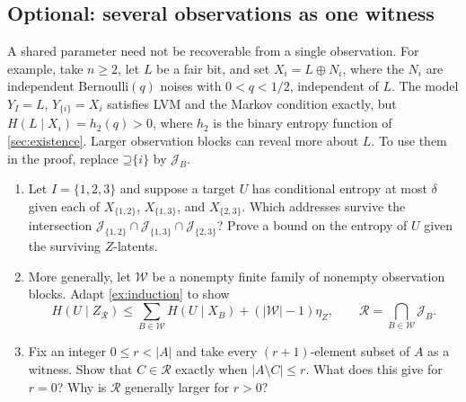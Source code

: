 \documentclass[11pt]{article}
\newcommand{\Up}{\mathord{\supseteq}}
\begin{document}
\subsection{Optional: several observations as one witness}
\label{sec:blocks}
A shared parameter need not be recoverable from a single observation. For
example, take $n\ge2$, let $L$ be a fair bit, and set
$X_i=L\mathbin{\oplus}N_i$, where the
$N_i$ are independent Bernoulli$(q)$ noises with $0<q<1/2$, independent of
$L$. The model $Y_I=L$, $Y_{\{i\}}=X_i$ satisfies LVM and the
Markov condition exactly, but $H(L\mid X_i)=h_2(q)>0$, where
$h_2$ is the binary entropy function of \cref{sec:existence}.
Larger observation blocks can reveal more about $L$. To use them in the proof,
replace $\Up\{i\}$ by $\mathcal{J}_B$.

\begin{exercise}
\label{ex:blocks}
\begin{enumerate}
\item Let $I=\{1,2,3\}$ and suppose a target $U$ has conditional entropy at
most $\delta$ given each of $X_{\{1,2\}}$, $X_{\{1,3\}}$, and
$X_{\{2,3\}}$. Which addresses survive the intersection
$\mathcal{J}_{\{1,2\}}\cap\mathcal{J}_{\{1,3\}}\cap\mathcal{J}_{\{2,3\}}$?
Prove a bound on the entropy of $U$ given the surviving $Z$-latents.
\item More generally, let $\mathcal{W}$ be a nonempty finite family of nonempty
observation blocks. Adapt \cref{ex:induction} to show
\[
 H(U\mid Z_{\mathcal{R}})\le
 \sum_{B\in\mathcal{W}}H(U\mid X_B)+(|\mathcal{W}|-1)\eta_Z,
 \qquad \mathcal{R}=\bigcap_{B\in\mathcal{W}}\mathcal{J}_B.
\]
\item Fix an integer $0\le r<|A|$ and take every $(r+1)$-element subset of $A$ as a
witness. Show that $C\in\mathcal{R}$ exactly when $|A\setminus C|\le r$.
What does this give for $r=0$? Why is $\mathcal{R}$ generally larger for $r>0$?
\end{enumerate}
\end{exercise}
\end{document}

